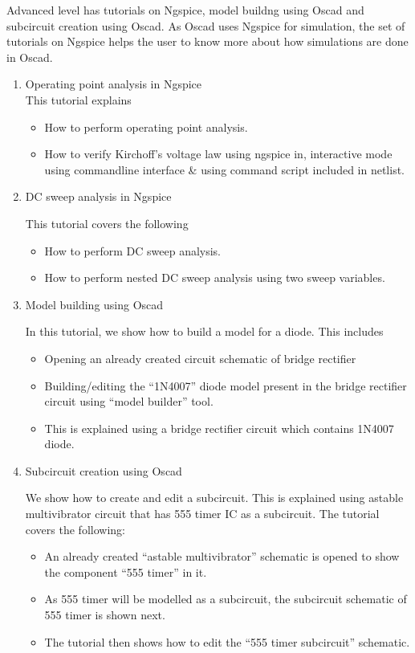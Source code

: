 Advanced level has tutorials on Ngspice, model buildng using Oscad and subcircuit creation using Oscad. As Oscad uses Ngspice for simulation, the set of tutorials on Ngspice helps the user to know more about how simulations are done in Oscad.
\begin{enumerate}
\item Operating point analysis in Ngspice\\
This tutorial explains
\begin{itemize}
\item How to perform operating point analysis.
\item How to verify Kirchoff's voltage law using ngspice in, interactive mode using
command­line interface \& using command script included in netlist.
\end{itemize}



\item DC sweep analysis in Ngspice

This tutorial covers the following
\begin{itemize}
\item How to perform DC sweep  analysis.
\item How to perform nested DC sweep analysis using two sweep variables.
\end{itemize}

\item Model building using Oscad


In this tutorial, we show how to build a model for a diode. This includes

\begin{itemize}
\item Opening an already created circuit schematic of bridge rectifier
\item Building/editing the “1N4007” diode model present in the bridge rectifier circuit using “model builder” tool.
\item This is explained using a bridge rectifier circuit which contains 1N4007 diode.

\end{itemize}


\item Subcircuit creation using Oscad

We show how to create and edit a subcircuit. This is explained using astable multivibrator circuit that has 555 timer IC as a subcircuit. The tutorial covers the following:

\begin{itemize}
\item An already created “astable multivibrator” schematic is opened to show the component “555 timer” in it.
\item As 555 timer will be modelled as a subcircuit, the subcircuit schematic of 555 timer is shown next.
\item The tutorial then shows how to edit the  “555 timer subcircuit” schematic.
\end{itemize}
\end{enumerate}



